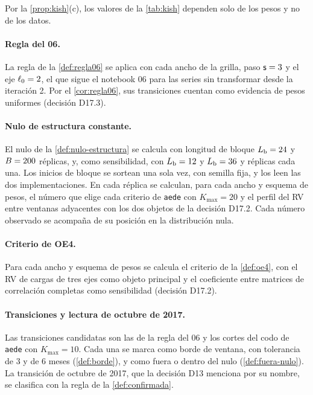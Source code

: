 Por la \cref{prop:kish}(c), los valores de la \cref{tab:kish} dependen solo de los pesos y no de
los datos.

\paragraph{Regla del 06.} La regla de la \cref{def:regla06} se aplica con cada ancho de la grilla,
paso $\mathsf{s}=3$ y el eje $\ell_0=2$, el que sigue el notebook 06 para las series sin transformar desde
la iteración 2. Por el \cref{cor:regla06}, sus transiciones cuentan como evidencia de pesos
uniformes (decisión D17.3).

\paragraph{Nulo de estructura constante.} El nulo de la \cref{def:nulo-estructura} se calcula con
longitud de bloque $L_{\mathrm{b}}=24$ y $B=200$ réplicas, y, como
sensibilidad, con $L_{\mathrm{b}}=12$ y $L_{\mathrm{b}}=36$ y
\replicasNuloSensibilidad{} réplicas cada una. Los inicios de bloque se sortean una sola vez, con
semilla fija, y los leen las dos implementaciones. En cada réplica se calculan, para cada ancho y
esquema de pesos, el número que elige cada criterio de \texttt{aede} con $K_{\max}=20$ y el perfil
del RV entre ventanas adyacentes con los dos objetos de la decisión D17.2. Cada número observado
se acompaña de su posición en la distribución nula.

\paragraph{Criterio de OE4.} Para cada ancho y esquema de pesos se calcula el criterio de la
\cref{def:oe4}, con el RV de cargas de tres ejes como objeto principal y el coeficiente entre
matrices de correlación completas como sensibilidad (decisión D17.2).

\paragraph{Transiciones y lectura de octubre de 2017.} Las transiciones candidatas son las de la
regla del 06 y los cortes del codo de \texttt{aede} con $K_{\max}=10$. Cada una se marca como borde
de ventana, con tolerancia de 3 y de 6 meses (\cref{def:borde}), y como fuera o dentro del nulo
(\cref{def:fuera-nulo}). La transición de octubre de 2017, que la decisión D13 menciona por su
nombre, se clasifica con la regla de la \cref{def:confirmada}.

